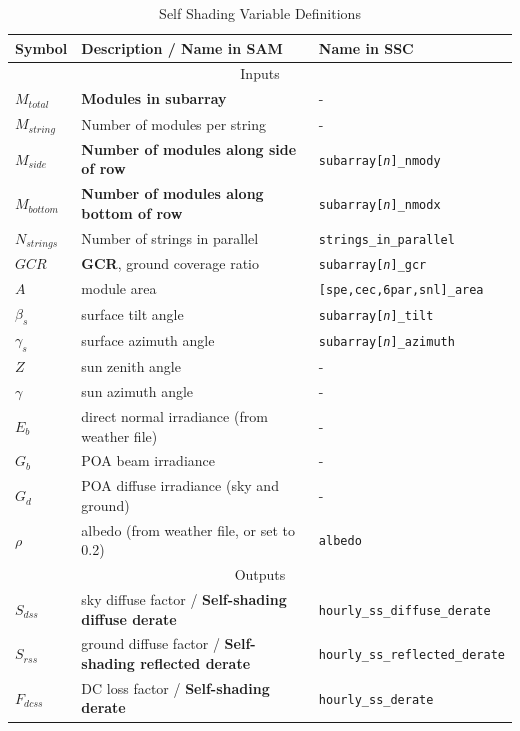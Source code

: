 \documentclass[12pt,letterpaper]{article}
\newcommand\GCR{\ensuremath{\mathit{GCR}}}
\begin{document}
\begin{table}
\begin{center}
\caption{Self Shading Variable Definitions}
\begin{tabular}{lll}
\midrule
Symbol & Description / \textbf{Name in SAM} & Name in SSC\\
\midrule
\multicolumn{3}{c}{Inputs}\\
$M_{total}$ & \textbf{Modules in subarray} & -\\
$M_{string}$ & Number of modules per string & -\\
$M_{side}$ & \textbf{Number of modules along side of row} & \texttt{subarray[\textit{n}]\_nmody}\\
$M_{bottom}$ & \textbf{Number of modules along bottom of row} & \texttt{subarray[\textit{n}]\_nmodx}\\
$N_{strings}$ & Number of strings in parallel & \texttt{strings\_in\_parallel}\\
$\GCR$ & \textbf{GCR}, ground coverage ratio & \texttt{subarray[\textit{n}]\_gcr}\\
$A$ & module area & \texttt{[spe,cec,6par,snl]\_area}\\
$\beta_s$ & surface tilt angle & \texttt{subarray[\textit{n}]\_tilt} \\
$\gamma_s$ & surface azimuth angle & \texttt{subarray[\textit{n}]\_azimuth} \\
$Z$ & sun zenith angle & -\\
$\gamma$ & sun azimuth angle & - \\
$E_b$ & direct normal irradiance (from weather file) & - \\
$G_b$ & POA beam irradiance & - \\
$G_d$ & POA diffuse irradiance (sky and ground) & - \\
$\rho$ & albedo (from weather file, or set to 0.2) & \texttt{albedo} \\
\midrule
\multicolumn{3}{c}{Outputs}\\
$S_{dss}$ & sky diffuse factor  / \textbf{Self-shading diffuse derate}& \texttt{hourly\_ss\_diffuse\_derate}\\
$S_{rss}$ & ground diffuse factor  / \textbf{Self-shading reflected derate}& \texttt{hourly\_ss\_reflected\_derate}\\
$F_{dcss}$& DC loss factor / \textbf{Self-shading derate} & \texttt{hourly\_ss\_derate}\\
\end{tabular}
\label{tab-selfshadinputs}
\end{center}
\end{table}
\end{document}
